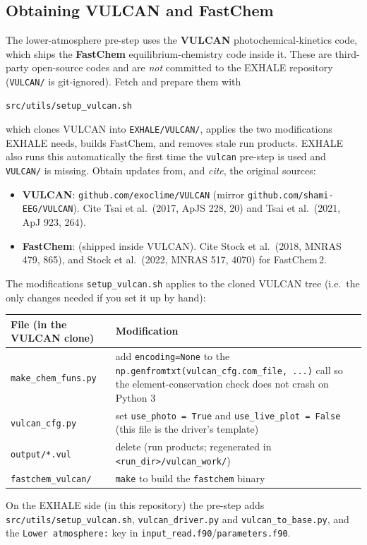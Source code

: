 \documentclass[english,a4paper]{my_memo}
\begin{document}
\subsection{Obtaining VULCAN and FastChem}\label{sec:vulcan-obtain}
The lower-atmosphere pre-step uses the \textbf{VULCAN} photochemical-kinetics
code, which ships the \textbf{FastChem} equilibrium-chemistry code inside it.
These are third-party open-source codes and are \emph{not} committed to the
EXHALE repository (\texttt{VULCAN/} is git-ignored). Fetch and prepare them with
\begin{verbatim}
src/utils/setup_vulcan.sh
\end{verbatim}
which clones VULCAN into \texttt{EXHALE/VULCAN/}, applies the two modifications
EXHALE needs, builds FastChem, and removes stale run products. EXHALE also runs
this automatically the first time the \texttt{vulcan} pre-step is used and
\texttt{VULCAN/} is missing. Obtain updates from, and \emph{cite}, the original
sources:
\begin{itemize}
\item \textbf{VULCAN}: \texttt{github.com/exoclime/VULCAN} (mirror
  \texttt{github.com/shami-EEG/VULCAN}). Cite Tsai et al.\ (2017, ApJS 228, 20)
  and Tsai et al.\ (2021, ApJ 923, 264).
\item \textbf{FastChem}: 
  (shipped inside VULCAN). Cite Stock et al.\ (2018, MNRAS 479, 865), and Stock
  et al.\ (2022, MNRAS 517, 4070) for FastChem\,2.
\end{itemize}
The modifications \texttt{setup\_vulcan.sh} applies to the cloned VULCAN tree
(i.e.\ the only changes needed if you set it up by hand):
\begin{center}\small
\begin{tabular}{@{}p{3.6cm}p{10.2cm}@{}}
\toprule
File (in the VULCAN clone) & Modification \\
\midrule
\texttt{make\_chem\_funs.py} & add \texttt{encoding=None} to the
  \texttt{np.genfromtxt(vulcan\_cfg.com\_file, ...)} call so the
  element-conservation check does not crash on Python 3 \\
\texttt{vulcan\_cfg.py} & set \texttt{use\_photo = True} and
  \texttt{use\_live\_plot = False} (this file is the driver's template) \\
\texttt{output/*.vul} & delete (run products; regenerated in
  \texttt{<run\_dir>/vulcan\_work/}) \\
\texttt{fastchem\_vulcan/} & \texttt{make} to build the \texttt{fastchem} binary \\
\bottomrule
\end{tabular}
\end{center}
On the EXHALE side (in this repository) the pre-step adds
\texttt{src/utils/setup\_vulcan.sh}, \texttt{vulcan\_driver.py} and
\texttt{vulcan\_to\_base.py}, and the \texttt{Lower atmosphere:} key in
\texttt{input\_read.f90}/\texttt{parameters.f90}.
\end{document}
